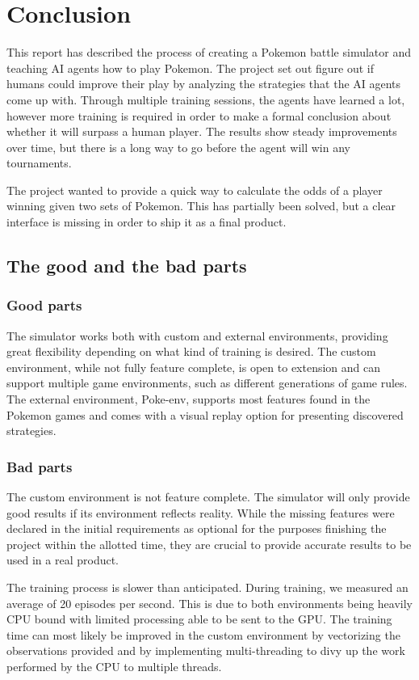 \chapter{Conclusion}
\label{chap:conclusion}

This report has described the process of creating a Pokemon battle simulator and teaching AI agents how to play Pokemon.
The project set out figure out if humans could improve their play by analyzing the strategies that the AI agents come up
with. Through multiple training sessions, the agents have learned a lot, however more training is required in order to 
make a formal conclusion about whether it will surpass a human player. The results show steady improvements over time, but
there is a long way to go before the agent will win any tournaments.

The project wanted to provide a quick way to calculate the odds of a player winning given two sets of Pokemon. This has
partially been solved, but a clear interface is missing in order to ship it as a final product.

\section{The good and the bad parts}
\label{sec:good-bad-parts}

\subsection{Good parts}
The simulator works both with custom and external environments, providing great flexibility depending
on what kind of training is desired. The custom environment, while not fully feature complete, is open to extension and
can support multiple game environments, such as different generations of game rules. The external environment, Poke-env, 
supports most features found in the Pokemon games and comes with a visual replay option for presenting discovered strategies.

\subsection{Bad parts}
The custom environment is not feature complete. The simulator will only provide good results if its environment reflects
reality. While the missing features were declared in the initial requirements as optional for the purposes finishing the
project within the allotted time, they are crucial to provide accurate results to be used in a real product.

The training process is slower than anticipated. During training, we measured an average of 20 episodes per second. This 
is due to both environments being heavily CPU bound with limited processing able to be sent to the GPU. The training time
can most likely be improved in the custom environment by vectorizing the observations provided and by implementing 
multi-threading to divy up the work performed by the CPU to multiple threads. 
